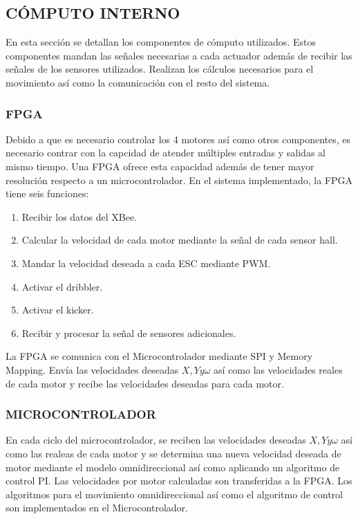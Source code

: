 \documentclass[twocolumn,10pt]{amrob}
\begin{document}
\subsection*{CÓMPUTO INTERNO}
En esta sección se detallan los componentes de cómputo utilizados. Estos componentes mandan las señales necesarias a cada actuador además de recibir las señales de los sensores utilizados. Realizan los cálculos necesarios para el movimiento así como la comunicación con el resto del sistema.  
\subsubsection*{FPGA}
Debido a que es necesario controlar los 4 motores así como otros componentes, es necesario contrar con la capcidad de atender múltiples entradas y salidas al mismo tiempo. Una FPGA ofrece esta capacidad además de tener mayor resolución respecto a un microcontrolador. En el sistema implementado, la FPGA tiene seis funciones:
\begin{enumerate}
  \item Recibir los datos del XBee.
  \item Calcular la velocidad de cada motor mediante la señal de cada sensor hall.
  \item Mandar la velocidad deseada a cada ESC mediante PWM.
  \item Activar el dribbler.
  \item Activar el kicker.
  \item Recibir y procesar la señal de sensores adicionales.
\end{enumerate}
La FPGA se comunica con el Microcontrolador mediante SPI y Memory Mapping. Envía las velocidades deseadas \(X, Y y \omega\) así como las velocidades reales de cada motor y recibe las velocidades deseadas para cada motor.\par

\subsubsection*{MICROCONTROLADOR}
En cada ciclo del microcontrolador, se reciben las velocidades deseadas \(X, Y y \omega\) así como las realeas de cada motor y se determina una nueva velocidad deseada de motor mediante el modelo omnidireccional así como aplicando un algoritmo de control PI. Las velocidades por motor calculadas son transferidas a la FPGA. Los algoritmos para el movimiento omnidireccional así como el algoritmo de control son implementados en el Microcontrolador.
\end{document}
